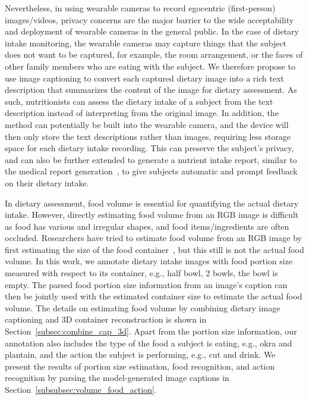 \documentclass[journal]{IEEEtran}
\begin{document}
Nevertheless, in using wearable cameras to record egocentric (first-person) images/videos, privacy concerns are the major barrier to the wide acceptability and deployment of wearable cameras in the general public. In the case of dietary intake monitoring, the wearable cameras may capture things that the subject does not want to be captured, for example, the room arrangement, or the faces of other family members who are eating with the subject. We therefore propose to use image captioning to convert each captured dietary image into a rich text description that summarizes the content of the image for dietary assessment. As such, nutritionists can assess the dietary intake of a subject from the text description instead of interpreting from the original image. In addition, the method can potentially be built into the wearable camera, and the device will then only store the text descriptions rather than images, requiring less storage space for each dietary intake recording. This can preserve the subject's privacy, and can also be further extended to generate a nutrient intake report, similar to the medical report generation~\cite{jing-etal-2018-automatic,li2018hybrid,wang2020unifying}, to give subjects automatic and prompt feedback on their dietary intake.




In dietary assessment, food volume is essential for quantifying the actual dietary intake. However, directly estimating food volume from an RGB image is difficult as food has various and irregular shapes, and food items/ingredients are often occluded. Researchers have tried to estimate food volume from an RGB image by first estimating the size of the food container~\cite{jia2022novel}, but this still is not the actual food volume. In this work, we annotate dietary intake images with food portion size measured with respect to its container, e.g., half bowl, 2 bowls, the bowl is empty. The parsed food portion size information from an image's caption can then be jointly used with the estimated container size to estimate the actual food volume. The details on estimating food volume by combining dietary image captioning and 3D container reconstruction is shown in Section~\ref{subsec:combine_cap_3d}. Apart from the portion size information, our annotation also includes the type of the food a subject is eating, e.g., okra and plantain, and the action the subject is performing, e.g., cut and drink. We present the results of portion size estimation, food recognition, and action recognition by parsing the model-generated image captions in Section~\ref{subsubsec:volume_food_action}.
\end{document}
